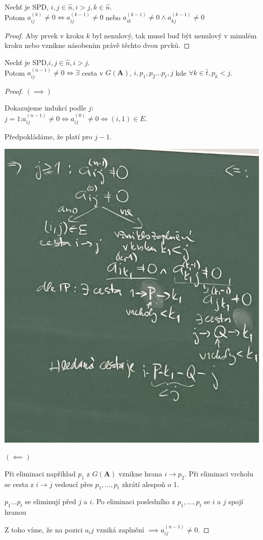 \documentclass[../main.tex]{subfiles}
\begin{document}
\begin{lemma}[O zaplnění]
    Nechť \matAsquare je SPD, $i,j\in \hat{n}, i>j, k\in \hat{n}$.\\
    Potom $a_{ij}^{(k)} \neq 0 \Leftrightarrow a_{ij}^{(k-1)} \neq 0$ nebo $a_{ik}^{(k-1)} \neq 0 \wedge a_{kj}^{(k-1)} \neq 0$
\end{lemma}

\begin{proof}
    Aby prvek v kroku $k$ byl nenulový, tak musel buď být nenulový v minulém kroku nebo vznikne násobením právě těchto dvou prvků.
\end{proof}

\begin{theorem}[O zaplnění]
    Nechť \matAsquare je SPD,$i,j\in \hat{n}, i>j$.\\
    Potom $a_{ij}^{(n-1)} \neq 0 \Leftrightarrow \exists$ cesta v $G(\mathbf{A})$, $i,p_1,p_2... p_t,j$ kde $\forall k \in \hat{t}, p_k < j$.
\end{theorem}

\begin{proof}
    $(\implies)$

    Dokazujeme indukcí podle $j$: \\$j=1$:$ a_{ij}^{(n-1)} \neq 0 \Leftrightarrow a_{ij}^{(0)} \neq 0 \Leftrightarrow (i,1)\in E$.

    Předpokládáme, že platí pro $j-1$.

    \begin{center}
        \includegraphics[width=0.5\linewidth]{images/19-10-dukazzleva.jpg}
    \end{center}

    $(\impliedby)$ 
    
    Při eliminaci například $p_1$ z $G(\mathbf{A})$ vznikne 
    hrana $i\rightarrow p_2$. Při eliminaci vrcholu se cesta 
    z $i \rightarrow j$ vedoucí přes $p_1,...,p_t$ zkrátí 
    alespoň o 1.

    $p_1 ... p_t$ se eliminují před $j$ a $i$. Po eliminaci 
    posledního z $p_1,...,p_t$ se $i$ a $j$ spojí hranou

    Z toho víme, že na pozici $a_ij$ vzniká zaplnění $\implies a_{ij}^{(n-1)}\neq 0$.
\end{proof}
\end{document}
